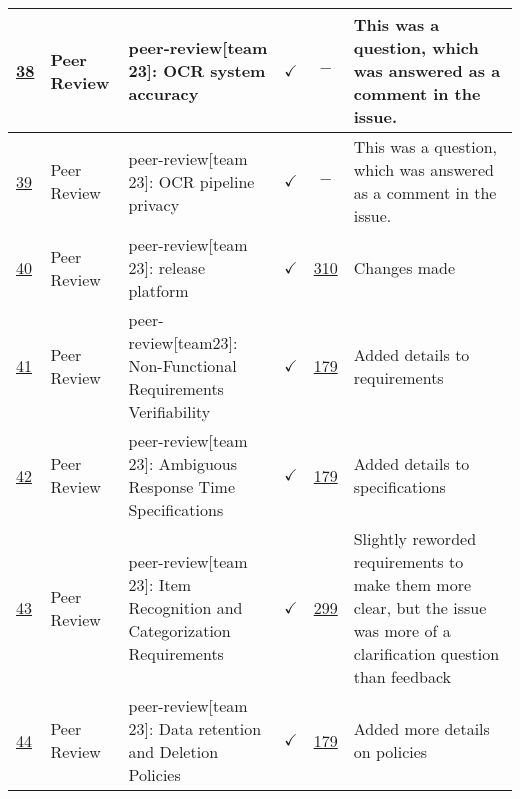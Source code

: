 \documentclass{article}
\begin{document}
\begin{table}[H]
{\begin{tabular}{p{1.5cm} p{2cm} p{3.5cm} c c p{4cm}}
        \href{https://github.com/PlutosCapstone/Plutos/issues/38}{38} & Peer
        Review & peer-review[team 23]: OCR system accuracy & $\checkmark$ & $-$
        & This was a question, which was answered as a comment in the issue.  \\ \hline
        \href{https://github.com/PlutosCapstone/Plutos/issues/39}{39} & Peer
        Review & peer-review[team 23]: OCR pipeline privacy & $\checkmark$ & $-$ &
        This was a question, which was answered as a comment in the issue.  \\ \hline
        \href{https://github.com/PlutosCapstone/Plutos/issues/40}{40} & Peer
        Review & peer-review[team 23]: release platform & $\checkmark$
        & \href{https://github.com/PlutosCapstone/Plutos/pull/310}{310} & Changes made \\ \hline
        \href{https://github.com/PlutosCapstone/Plutos/issues/41}{41} & Peer
        Review & peer-review[team23]: Non-Functional Requirements Verifiability
        & $\checkmark$ &
        \href{https://github.com/PlutosCapstone/Plutos/pull/179}{179} & Added
        details to requirements  \\ \hline
        \href{https://github.com/PlutosCapstone/Plutos/issues/42}{42} & Peer
        Review & peer-review[team 23]: Ambiguous Response Time Specifications  &
        $\checkmark$ &
        \href{https://github.com/PlutosCapstone/Plutos/pull/179}{179} & Added
        details to specifications  \\ \hline
        \href{https://github.com/PlutosCapstone/Plutos/issues/43}{43} & Peer
        Review & peer-review[team 23]: Item Recognition and Categorization
        Requirements  & $\checkmark$ &
        \href{https://github.com/PlutosCapstone/Plutos/pull/299}{299} & Slightly
        reworded requirements to make them more clear, but the issue was more of
        a clarification question than feedback \\ \hline
        \href{https://github.com/PlutosCapstone/Plutos/issues/44}{44} & Peer
        Review & peer-review[team 23]: Data retention and Deletion Policies  &
        $\checkmark$ &
        \href{https://github.com/PlutosCapstone/Plutos/pull/179}{179} & Added
        more details on policies \\
    \bottomrule
    \end{tabular}%
    }
\end{table}
\end{document}
